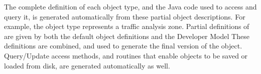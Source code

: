 The complete definition of each object type, and the Java code used to
access and query it, is generated automatically from these partial object
descriptions.  For example, the  object type represents a
traffic analysis zone.  Partial definitions of  are given by
both the default object definitions
and the Developer Model
These definitions are combined, and used to generate the final
version of the  object.
Query/Update access methods, and routines that 
enable objects to be saved or loaded from disk, are 
generated automatically as well.




